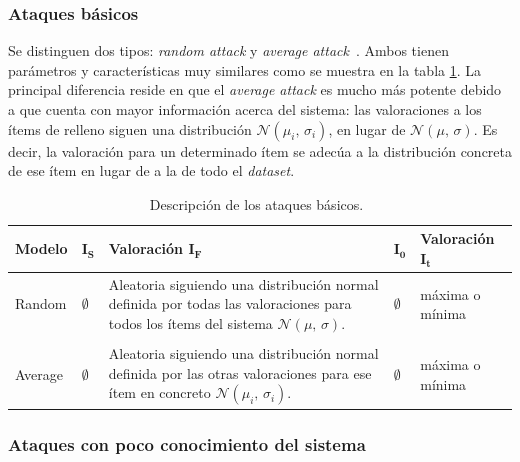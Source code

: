 \subsubsection{Ataques básicos}

Se distinguen dos tipos: \textit{random attack} y \textit{average attack}~\cite{mingdan2018ShillingAttacksAReview}. Ambos tienen parámetros y características muy similares como se muestra en la tabla \ref{tabla_descripcion_ataques_basicos}. La principal diferencia reside en que el \textit{average attack} es mucho más potente debido a que cuenta con mayor información acerca del sistema: las valoraciones a los ítems de relleno siguen una distribución $\mathcal{N}(\mu_i,\,\sigma_i)$, en lugar de $\mathcal{N}(\mu,\,\sigma)$. Es decir, la valoración para un determinado ítem se adecúa a la distribución concreta de ese ítem en lugar de a la de todo el \textit{dataset}.


\begin{table}
\small
\begin{centering}

		\begin{tabular}{@{}l l l l l@{}}
		\toprule
		\textbf{Modelo} & $\mathbf{I_S}$ & \textbf{Valoración} $\mathbf{I_F}$ & $\mathbf{I_0}$ & \textbf{Valoración} $\mathbf{I_t}$\\ 
		\midrule
	
		Random & $\emptyset$ & \parbox{20em}{Aleatoria siguiendo una distribución normal definida por todas las valoraciones para todos los ítems del sistema $\mathcal{N}(\mu,\,\sigma)$.} & $\emptyset$ & máxima o mínima \\\\
		
		Average & $\emptyset$ & \parbox{20em}{Aleatoria siguiendo una distribución normal definida por las otras valoraciones para ese ítem en concreto $\mathcal{N}(\mu_i,\,\sigma_i)$.} & $\emptyset$ & máxima o mínima\\
		\bottomrule
		\end{tabular}
	
\end{centering}
\caption{Descripción de los ataques básicos.~\cite{zhou2021SemisupervisedRecommendationAttack}}
\label{tabla_descripcion_ataques_basicos}	
\end{table}


\subsubsection{Ataques con poco conocimiento del sistema}

